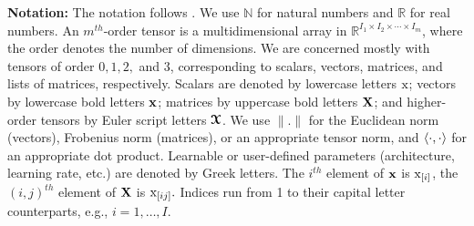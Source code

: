 \noindent\textbf{Notation:}
The notation follows \cite{kolda2009tensor}. We use $\mathbb{N}$ for natural numbers and $\mathbb{R}$ for real numbers. An $m^{th}$-order tensor is a multidimensional array in $\mathbb{R}^{I_1 \times I_2 \times \cdots \times I_{m}}$, where the order denotes the number of dimensions. We are concerned mostly with tensors of order $0, 1, 2,$ and $3$, corresponding to scalars, vectors, matrices, and lists of matrices, respectively. Scalars are denoted by lowercase letters $\mathrm{x}$; vectors by lowercase bold letters $\boldsymbol{\mathrm{x}}$; matrices by uppercase bold letters $\boldsymbol{\mathrm{X}}$; and higher-order tensors by Euler script letters $\boldsymbol{\mathcal{X}}$. We use $\|.\|$ for the Euclidean norm (vectors), Frobenius norm (matrices), or an appropriate tensor norm, and $\left\langle \cdot,\cdot \right\rangle$ for an appropriate dot product. Learnable or user-defined parameters (architecture, learning rate, etc.) are denoted by Greek letters. The $i^{th}$ element of $\boldsymbol{\mathrm{x}}$ is $\mathrm{x}_{[i]}$, the $(i,j)^{th}$ element of $\boldsymbol{\mathrm{X}}$ is $\mathrm{x}_{[ij]}.$ Indices run from 1 to their capital letter counterparts, e.g., $i = 1, \ldots, I.$

